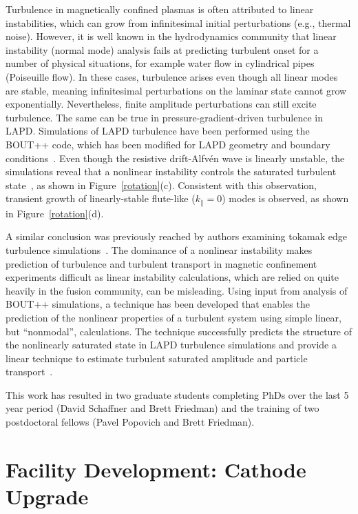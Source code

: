 \documentclass[11pt]{article}
\renewcommand{\cite}{\citep}
\begin{document}
Turbulence in magnetically confined plasmas is often attributed to
linear instabilities, which can grow from infinitesimal initial
perturbations (e.g., thermal noise). However, it is well known in the
hydrodynamics community that linear instability (normal mode) analysis
fails at predicting turbulent onset for a number of physical
situations, for example water flow in cylindrical pipes (Poiseuille
flow). In these cases, turbulence arises even though all linear modes
are stable, meaning infinitesimal perturbations on the laminar state
cannot grow exponentially. Nevertheless, finite amplitude
perturbations can still excite turbulence.  The same
can be true in pressure-gradient-driven turbulence in LAPD.
Simulations of LAPD turbulence have been performed using the BOUT++
code, which has been modified for
LAPD geometry and boundary
conditions~\cite{popovich:2010a,popovich:2010b,umansky:2011,friedman:2012a}.  Even though the
resistive drift-Alfv\'{e}n wave is linearly unstable, the simulations reveal that a
nonlinear instability controls the saturated turbulent state~\cite{friedman:2012b,friedman:2013,friedman:2014,friedman:2015},
as shown in Figure~\ref{rotation}(c).  Consistent with this observation, transient growth of linearly-stable
flute-like ($k_\parallel = 0$) modes is observed, as shown in
Figure~\ref{rotation}(d).  


A similar conclusion was previously reached by authors examining
tokamak edge turbulence simulations~\cite{drake:1995, biskamp:1995,
scott:1990}.  The dominance of a nonlinear instability makes prediction
of turbulence and turbulent transport in magnetic confinement
experiments difficult as linear instability calculations, which are
relied on quite heavily in the fusion community, can be misleading.
Using input from analysis of BOUT++ simulations, a technique has been developed 
that enables the prediction of the nonlinear properties of a turbulent
system using simple linear, but ``nonmodal'', calculations. The
technique successfully predicts the structure of the nonlinearly
saturated state in LAPD turbulence simulations and provide a linear
technique to estimate turbulent saturated amplitude and particle
transport~\cite{friedman:2014,friedman:2015}.  

This work has resulted in two graduate students completing PhDs over
the last 5 year period (David Schaffner and Brett Friedman) and the
training of two postdoctoral fellows (Pavel Popovich and Brett
Friedman).  



\section{Facility Development: Cathode Upgrade}
\end{document}
